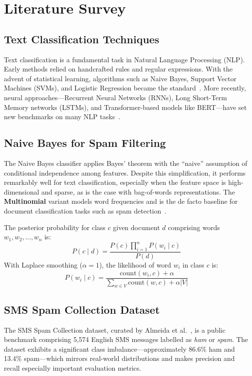\documentclass[paper=a4, fontsize=11pt]{scrartcl}
\numberwithin{equation}{section}
\numberwithin{figure}{section}
\numberwithin{table}{section}
\begin{document}
\section{Literature Survey}

\subsection{Text Classification Techniques}
Text classification is a fundamental task in Natural Language Processing (NLP).  Early methods relied on handcrafted rules and regular expressions.  With the advent of statistical learning, algorithms such as Naive Bayes, Support Vector Machines (SVMs), and Logistic Regression became the standard~\cite{manning2008}.  More recently, neural approaches—Recurrent Neural Networks (RNNs), Long Short-Term Memory networks (LSTMs), and Transformer-based models like BERT—have set new benchmarks on many NLP tasks~\cite{devlin2019}.

\subsection{Naive Bayes for Spam Filtering}
The Naive Bayes classifier applies Bayes' theorem with the ``naive'' assumption of conditional independence among features.  Despite this simplification, it performs remarkably well for text classification, especially when the feature space is high-dimensional and sparse, as is the case with bag-of-words representations.  The \textbf{Multinomial} variant models word frequencies and is the de facto baseline for document classification tasks such as spam detection~\cite{mccallum1998}.

The posterior probability for class $c$ given document $d$ comprising words $w_1, w_2, \ldots, w_n$ is:
\begin{equation}
    P(c \mid d) = \frac{P(c) \prod_{i=1}^{n} P(w_i \mid c)}{P(d)}
    \label{eq:bayes}
\end{equation}
With Laplace smoothing ($\alpha = 1$), the likelihood of word $w_i$ in class $c$ is:
\begin{equation}
    P(w_i \mid c) = \frac{\text{count}(w_i, c) + \alpha}{\sum_{w \in V} \text{count}(w, c) + \alpha |V|}
    \label{eq:smoothing}
\end{equation}

\subsection{SMS Spam Collection Dataset}
The SMS Spam Collection dataset, curated by Almeida et al.~\cite{almeida2011}, is a public benchmark comprising 5,574 English SMS messages labelled as \textit{ham} or \textit{spam}.  The dataset exhibits a significant class imbalance—approximately 86.6\% ham and 13.4\% spam—which mirrors real-world distributions and makes precision and recall especially important evaluation metrics.
\end{document}
